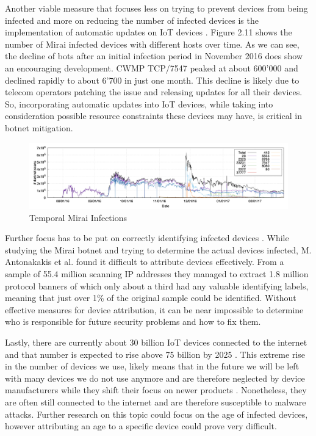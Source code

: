 Another viable measure that focuses less on trying to prevent devices from being infected and more on reducing the number of infected devices is the implementation of automatic updates on IoT devices \cite{Antonakakis17}. Figure 2.11 shows the number of Mirai infected devices with different hosts over time. As we can see, the decline of bots after an initial infection period in November 2016 does show an encouraging development. CWMP TCP/7547 peaked at about 600'000 and declined rapidly to about 6'700 in just one month. This decline is likely due to telecom operators patching the issue and releasing updates for all their devices. So, incorporating automatic updates into IoT devices, while taking into consideration possible resource constraints these devices may have, is critical in botnet mitigation.

\begin{figure}[ht]
\begin{center} \includegraphics[scale=0.5]{Talk11/MiraiInfections} \end{center}
\caption{Temporal Mirai Infections \cite{Antonakakis17}}
\label{label}
\end{figure}

Further focus has to be put on correctly identifying infected devices \cite{Antonakakis17}. While studying the Mirai botnet and trying to determine the actual devices infected, M. Antonakakis et al. \cite{Antonakakis17} found it difficult to attribute devices effectively. From a sample of 55.4 million scanning IP addresses they managed to extract 1.8 million protocol banners of which only about a third had any valuable identifying labels, meaning that just over 1\% of the original sample could be identified. Without effective measures for device attribution, it can be near impossible to determine who is responsible for future security problems and how to fix them.

Lastly, there are currently about 30 billion IoT devices connected to the internet and that number is expected to rise above 75 billion by 2025 \cite{Statista}. This extreme rise in the number of devices we use, likely means that in the future we will be left with many devices we do not use anymore and are therefore neglected by device manufacturers while they shift their focus on newer products \cite{Antonakakis17}. Nonetheless, they are often still connected to the internet and are therefore susceptible to malware attacks. Further research on this topic could focus on the age of infected devices, however attributing an age to a specific device could prove very difficult.

